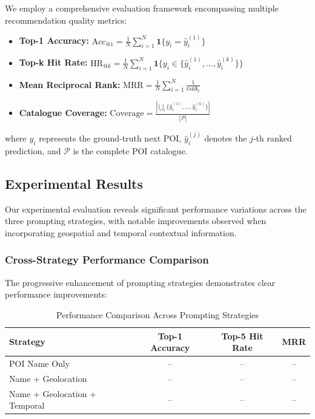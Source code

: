 \documentclass[12pt,a4paper]{article}
\begin{document}
We employ a comprehensive evaluation framework encompassing multiple recommendation quality metrics:

\begin{itemize}
\item \textbf{Top-1 Accuracy:} $\text{Acc}_{@1} = \frac{1}{N}\sum_{i=1}^{N}\mathbf{1}\{y_i = \hat{y}_i^{(1)}\}$
\item \textbf{Top-k Hit Rate:} $\text{HR}_{@k} = \frac{1}{N}\sum_{i=1}^{N}\mathbf{1}\{y_i \in \{\hat{y}_i^{(1)}, \ldots, \hat{y}_i^{(k)}\}\}$
\item \textbf{Mean Reciprocal Rank:} $\text{MRR} = \frac{1}{N}\sum_{i=1}^{N}\frac{1}{\text{rank}_i}$
\item \textbf{Catalogue Coverage:} $\text{Coverage} = \frac{|\bigcup_{i}\{\hat{y}_i^{(1)}, \ldots, \hat{y}_i^{(k)}\}|}{|\mathcal{P}|}$
\end{itemize}

where $y_i$ represents the ground-truth next POI, $\hat{y}_i^{(j)}$ denotes the $j$-th ranked prediction, and $\mathcal{P}$ is the complete POI catalogue.

\subsection{Experimental Results}

Our experimental evaluation reveals significant performance variations across the three prompting strategies, with notable improvements observed when incorporating geospatial and temporal contextual information.

\subsubsection{Cross-Strategy Performance Comparison}

The progressive enhancement of prompting strategies demonstrates clear performance improvements:

\begin{table}[h]
\centering
\caption{Performance Comparison Across Prompting Strategies}
\label{tab:strategy_comparison}
\begin{tabular}{lccc}
\toprule
\textbf{Strategy} & \textbf{Top-1 Accuracy} & \textbf{Top-5 Hit Rate} & \textbf{MRR} \\
\midrule
POI Name Only & -- & -- & -- \\
Name + Geolocation & -- & -- & -- \\
Name + Geolocation + Temporal & -- & -- & -- \\
\bottomrule
\end{tabular}
\end{table}
\end{document}
